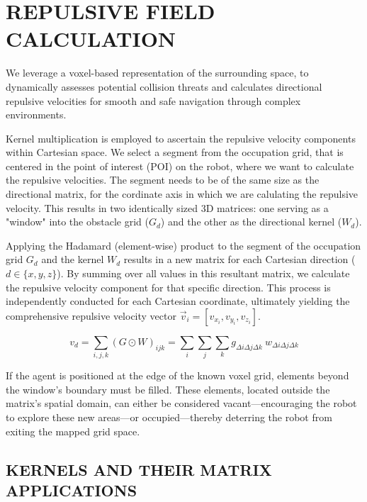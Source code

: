 \documentclass[letterpaper, 10 pt, conference]{ieeeconf}  %
\begin{document}
\section{REPULSIVE FIELD CALCULATION}
\label{section:repulsive_vel}

We leverage a voxel-based representation of the surrounding space, to dynamically assesses potential collision threats and calculates directional repulsive velocities for smooth and safe navigation through complex environments. 

Kernel multiplication is employed to ascertain the repulsive velocity components within Cartesian space. We select a segment from the occupation grid, that is centered in the point of interest (POI) on the robot, where we want to calculate the repulsive velocities. The segment needs to be of the same size as the directional matrix, for the cordinate axis in which we are calulating the repulsive velocity. This results in two identically sized 3D matrices: one serving as a "window" into the obstacle grid (\(G_d\)) and the other as the directional kernel (\(W_d\)).

Applying the Hadamard (element-wise) product to the segment of the occupation grid \(G_d\) and the kernel \(W_d\) results in a new matrix for each Cartesian direction (\(d \in \{x, y, z\}\)). By summing over all values in this resultant matrix, we calculate the repulsive velocity component for that specific direction. This process is independently conducted for each Cartesian coordinate, ultimately yielding the comprehensive repulsive velocity vector \(\vec{v}_i = [ v_{x_i}, v_{y_i}, v_{z_i}]\).

\begin{equation}
	v_d = \sum_{i,j,k} (G \odot W)_{ijk} = \sum_{i}\sum_{j}\sum_{k} g_{\Delta i \Delta j \Delta k} ~  w_{\Delta i \Delta j \Delta k}
	\label{eq:matrix-product}
\end{equation}

If the agent is positioned at the edge of the known voxel grid, elements beyond the window's boundary must be filled. These elements, located outside the matrix's spatial domain, can either be considered vacant—encouraging the robot to explore these new areas—or occupied—thereby deterring the robot from exiting the mapped grid space.

\subsection{KERNELS AND THEIR MATRIX APPLICATIONS}
\end{document}
